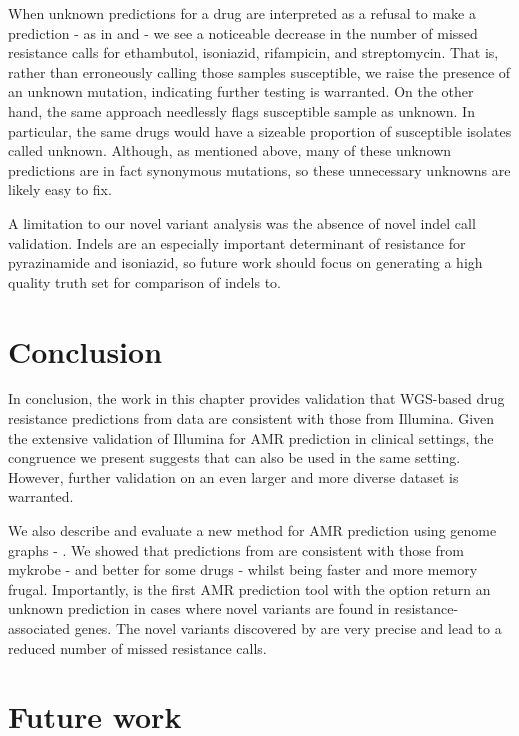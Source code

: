 When unknown predictions for a drug are interpreted as a refusal to make a prediction - as in \cite{cryptic2018} and \cite{hunt2019} - we see a noticeable decrease in the number of missed resistance calls for ethambutol, isoniazid, rifampicin, and streptomycin. That is, rather than erroneously calling those samples susceptible, we raise the presence of an unknown mutation, indicating further testing is warranted. On the other hand, the same approach needlessly flags susceptible sample as unknown. In particular, the same drugs would have a sizeable proportion of susceptible isolates called unknown. Although, as mentioned above, many of these unknown predictions are in fact synonymous mutations, so these unnecessary unknowns are likely easy to fix.

A limitation to our novel variant analysis was the absence of novel indel call validation. Indels are an especially important determinant of resistance for pyrazinamide and isoniazid, so future work should focus on generating a high quality truth set for comparison of \drprg{} indels to.

\section{Conclusion}
In conclusion, the work in this chapter provides validation that WGS-based drug resistance predictions from \ont{} data are consistent with those from Illumina. Given the extensive validation of Illumina for \mtb{} AMR prediction in clinical settings, the congruence we present suggests that \ont{} can also be used in the same setting. However, further validation on an even larger and more diverse dataset is warranted. 

We also describe and evaluate a new method for AMR prediction using genome graphs - \drprg{}. We showed that predictions from \drprg{} are consistent with those from mykrobe - and better for some drugs - whilst being faster and more memory frugal. Importantly, \drprg{} is the first \mtb{} AMR prediction tool with the option return an unknown prediction in cases where novel variants are found in resistance-associated genes. The novel variants discovered by \drprg{} are very precise and lead to a reduced number of missed resistance calls.

\section{Future work}

